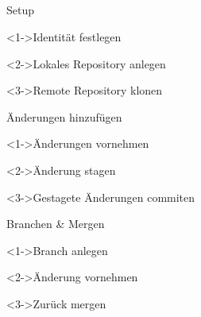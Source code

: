 \subsection{}

\begin{frame}{Setup}
    \begin{block}<1->{Identität festlegen}
\newline
{}
    \end{block}
    \vspace{2em}
    \begin{block}<2->{Lokales Repository anlegen}
    \end{block}
    \begin{block}<3->{Remote Repository klonen}
    \end{block}
\end{frame}

\begin{frame}{Änderungen hinzufügen}
    \begin{block}<1->{Änderungen vornehmen}
    \end{block}
    \begin{block}<2->{Änderung stagen}
    \end{block}
    \begin{block}<3->{Gestagete Änderungen commiten}
    \end{block}
\end{frame}

\begin{frame}{Branchen \& Mergen}
    \begin{block}<1->{Branch anlegen}
        \newline
    \end{block}
    \begin{block}<2->{Änderung vornehmen}
        \newline
    \end{block}
    \begin{block}<3->{Zurück mergen}
        \newline
        \newline
    \end{block}
\end{frame}


